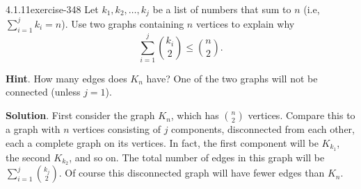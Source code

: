 \documentclass[twoside,11pt,]{book}
\numberwithin{equation}{chapter}
\begin{document}
\begin{divisionsolution}{4.1.11}{}{exercise-348}%
\hypertarget{p-4466}{}%
Let \(k_1, k_2, \ldots,
k_j\) be a list of numbers that sum to \(n\) (i.e, \(\sum_{i=1}^j k_i = n\)). Use two graphs containing \(n\) vertices to explain why%
\begin{equation*}
\sum_{i = 1}^j \binom{k_i}{2} \le \binom{n}{2}\text{.}
\end{equation*}
%
\par\smallskip%
\noindent\textbf{Hint}.\quad%
\hypertarget{p-4467}{}%
How many edges does \(K_n\) have?  One of the two graphs will not be connected (unless \(j=1\)).%
\par\smallskip%
\noindent\textbf{Solution}.\quad%
\hypertarget{p-4468}{}%
First consider the graph \(K_n\), which has \(\binom{n}{2}\) vertices. Compare this to a graph with \(n\) vertices consisting of \(j\) components, disconnected from each other, each a complete graph on its vertices. In fact, the first component will be \(K_{k_1}\), the second \(K_{k_2}\), and so on. The total number of edges in this graph will be \(\sum_{i=1}^j\binom{k_j}{2}\). Of course this disconnected graph will have fewer edges than \(K_n\).%
\end{divisionsolution}%
\end{document}
